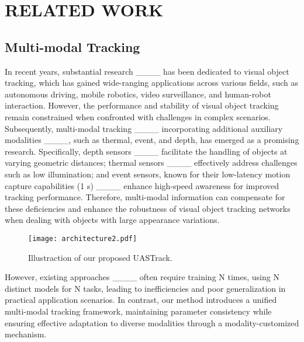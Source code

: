\section{RELATED WORK}
\subsection{Multi-modal Tracking}
In recent years, substantial research ____ has been dedicated to visual object tracking, which has gained wide-ranging applications across various fields, such as autonomous driving, mobile robotics, video surveillance, and human-robot interaction. 
However, the performance and stability of visual object tracking remain constrained when confronted with challenges in complex scenarios.
Subsequently, multi-modal tracking ____ incorporating additional auxiliary modalities ____, such as thermal, event, and depth, has emerged as a promising research.
Specifically, depth sensors ____ facilitate the handling of objects at varying geometric distances; thermal sensors ____ effectively address challenges such as low illumination; and event sensors, known for their low-latency motion capture capabilities (1 \textmu s) ____ enhance high-speed awareness for improved tracking performance.
Therefore, multi-modal information can compensate for these deficiencies and enhance the robustness of visual object tracking networks when dealing with objects with large appearance variations.

\begin{figure*}[t]
\centering
\texttt{[image: architecture2.pdf]}
\caption{Illustraction of our proposed UASTrack.}
\vspace{-3mm}
\label{fig:2}
\end{figure*}


However, existing approaches ____ often require training N times, using N distinct models for N tasks, leading to inefficiencies and poor generalization in practical application scenarios.
In contrast, our method introduces a unified multi-modal tracking framework, maintaining parameter consistency while ensuring effective adaptation to diverse modalities through a modality-customized mechanism.


